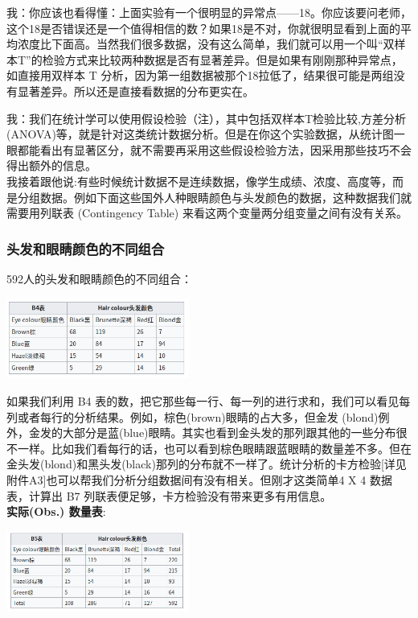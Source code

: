 我：你应该也看得懂：上面实验有一个很明显的异常点------18。你应该要问老师，这个18是否错误还是一个值得相信的数？如果18是不对，你就很明显看到上面的平均浓度比下面高。当然我们很多数据，没有这么简单，我们就可以用一个叫``双样本T''的检验方式来比较两种数据是否有显著差异。但是如果有刚刚那种异常点，如直接用双样本
T
分析，因为第一组数据被那个18拉低了，结果很可能是两组没有显著差异。所以还是直接看数据的分布更实在。

我：我们在统计学可以使用假设检验（注），其中包括双样本T检验比较,方差分析(ANOVA)等，就是针对这类统计数据分析。但是在你这个实验数据，从统计图一眼都能看出有显著区分，就不需要再采用这些假设检验方法，因采用那些技巧不会得出额外的信息。\\
我接着跟他说:有些时候统计数据不是连续数据，像学生成绩、浓度、高度等，而是分组数据。例如下面这些国外人种眼睛颜色与头发颜色的数据，这种数据我们就需要用列联表
(Contingency Table) 来看这两个变量两分组变量之间有没有关系。\\

\hypertarget{ux5934ux53d1ux548cux773cux775bux989cux8272ux7684ux4e0dux540cux7ec4ux5408}{%
\subsubsection{头发和眼睛颜色的不同组合}\label{ux5934ux53d1ux548cux773cux775bux989cux8272ux7684ux4e0dux540cux7ec4ux5408}}

592人的头发和眼睛颜色的不同组合：

\includegraphics[width=6cm]{Screenshotfrom2023-01-0222-19-18.png}

如果我们利用 B4
表的数，把它那些每一行、每一列的进行求和，我们可以看见每列或者每行的分析结果。例如，棕色(brown)眼睛的占大多，但金发
(blond)例外，金发的大部分是蓝(blue)眼睛。其实也看到金头发的那列跟其他的一些分布很不一样。比如我们看每行的话，也可以看到棕色眼睛跟蓝眼睛的数量差不多。但在金头发(blond)和黑头发(black)那列的分布就不一样了。统计分析的卡方检验{[}详见附件A3{]}也可以帮我们分析分组数据间有没有相关。但刚才这类简单4
X 4 数据表，计算出 B7 列联表便足够，卡方检验没有带来更多有用信息。\\
\textbf{实际(Obs.) 数量表}:

\includegraphics[width=6cm]{Screenshotfrom2023-01-0222-20-05.png}


